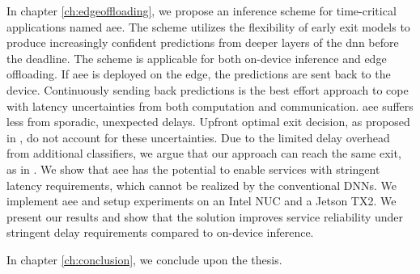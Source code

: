 In chapter \ref{ch:edgeoffloading}, we propose an inference scheme for time-critical applications named \acrfull{aee}. The scheme utilizes the flexibility of early exit models to produce increasingly confident predictions from deeper layers of the \gls{dnn} before the deadline. The scheme is applicable for both on-device inference and edge offloading. If \gls{aee} is deployed on the edge, the predictions are sent back to the device. Continuously sending back predictions is the best effort approach to cope with latency uncertainties from both computation and communication. \gls{aee} suffers less from sporadic, unexpected delays. Upfront optimal exit decision, as proposed in \cite{li_edge_2018}, do not account for these uncertainties. Due to the limited delay overhead from additional classifiers, we argue that our approach can reach the same exit, as in \cite{li_edge_2018}. We show that \gls{aee} has the potential to enable services with stringent latency requirements, which cannot be realized by the conventional DNNs. We implement \gls{aee} and setup experiments on an Intel NUC and a Jetson TX2. We present our results and show that the solution improves service reliability under stringent delay requirements compared to on-device inference.

In chapter \ref{ch:conclusion}, we conclude upon the thesis.
